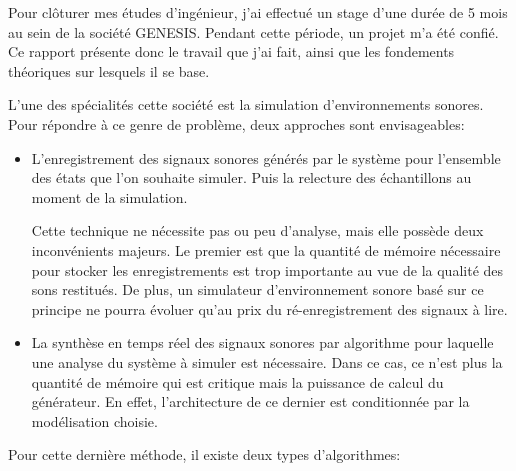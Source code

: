 Pour cl{\^o}turer mes {\'e}tudes d'ing{\'e}nieur, j'ai effectu{\'e} un stage d'une
dur{\'e}e de 5 mois au sein de la soci{\'e}t{\'e} GENESIS. Pendant cette
p{\'e}riode, un projet m'a {\'e}t{\'e} confi{\'e}. Ce rapport pr{\'e}sente donc le
travail que j'ai fait, ainsi que les fondements th{\'e}oriques sur
lesquels il se base.

L'une des sp{\'e}cialit{\'e}s cette soci{\'e}t{\'e} est la simulation
d'environnements sonores. Pour r{\'e}pondre {\`a} ce genre de probl{\`e}me,
deux approches sont envisageables:\\

\begin{itemize}
    \item L'enregistrement des signaux sonores g{\'e}n{\'e}r{\'e}s par le syst{\`e}me
    pour l'ensemble des {\'e}tats que l'on souhaite simuler. Puis la
    relecture des {\'e}chantillons au moment de la simulation.

    Cette technique ne n{\'e}cessite pas ou peu d'analyse, mais
    elle poss{\`e}de deux inconv{\'e}nients majeurs. Le premier est que
    la quantit{\'e} de m{\'e}moire n{\'e}cessaire pour stocker les enregistrements est
    trop importante au vue de la qualit{\'e} des sons restitu{\'e}s. De
    plus, un simulateur d'environnement sonore bas{\'e} sur ce
    principe ne pourra {\'e}voluer qu'au prix du r{\'e}-enregistrement des
    signaux {\`a} lire.\\

    \item La synth{\`e}se en temps r{\'e}el des signaux sonores par
    algorithme pour laquelle une analyse du syst{\`e}me {\`a} simuler est
    n{\'e}cessaire. Dans ce cas, ce n'est plus la quantit{\'e} de m{\'e}moire
    qui est critique mais la puissance de calcul du g{\'e}n{\'e}rateur.
    En effet, l'architecture de ce dernier est conditionn{\'e}e par la
    mod{\'e}lisation choisie.\\
\end{itemize}

Pour cette derni{\`e}re m{\'e}thode, il existe deux types d'algorithmes:\\

